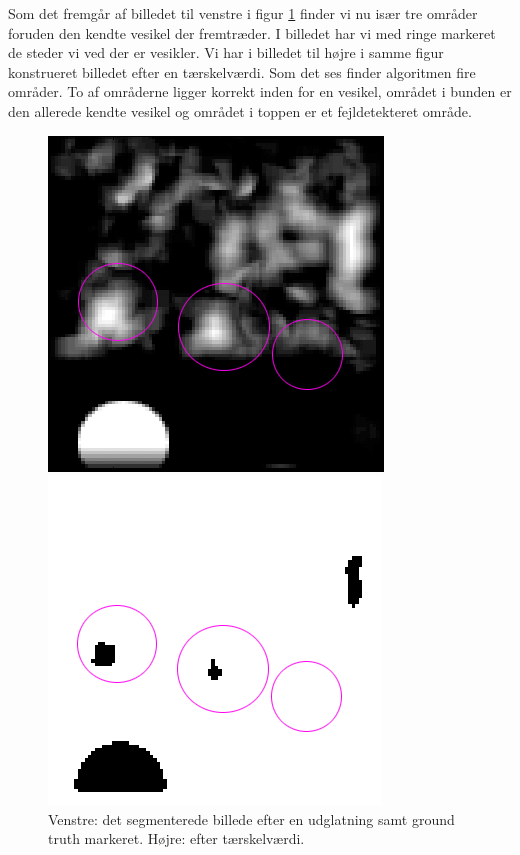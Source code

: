 Som det fremgår af billedet til venstre i figur \ref{fig:postmethod_sld_res5} finder vi nu især tre områder foruden den kendte vesikel der fremtræder. I billedet har vi med ringe markeret de steder vi ved der er vesikler. Vi har i billedet til højre i samme figur konstrueret billedet efter en tærskelværdi. Som det ses finder algoritmen fire områder. To af områderne ligger korrekt inden for en vesikel, området i bunden er den allerede kendte vesikel og området i toppen er et fejldetekteret område. 

\begin{figure}[H]
	\begin{minipage}[b]{0.5\linewidth}
		\centering
		\includegraphics[scale=0.54]{files/postmethod/img/sld_res5.png}
	\end{minipage}
	\hspace{0.8cm}
	\begin{minipage}[b]{0.5\linewidth}
		\centering
		\includegraphics[scale=0.54]{files/postmethod/img/sld_res6.png}
	\end{minipage}
	\caption{Venstre: det segmenterede billede efter en udglatning samt ground truth markeret. Højre: efter tærskelværdi.\label{fig:postmethod_sld_res5}}
\end{figure}


